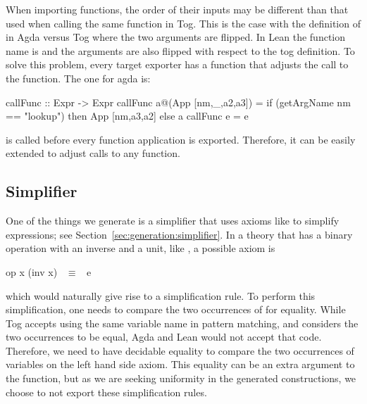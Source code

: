 \begin{comment}
In agda, \lstmath{Fin} is defined as 
\begin{agdacode}
data Fin : ~$\mathbb{N}$~ ~$\rightarrow$~ Set where
zero : {n : ~$\mathbb{N}$~} ~$\rightarrow$~ Fin (suc n)
suc  : {n : ~$\mathbb{N}$~} (i : Fin n) ~$\rightarrow$~ Fin (suc n)
\end{agdacode}
\end{comment} 
When importing functions, the order of their inputs may be different than that used when calling the same function in Tog. This is the case with the definition of  in Agda versus Tog where the two arguments are flipped. In Lean the function name is  and the arguments are also flipped with respect to the tog definition. To solve this problem, every target exporter has a function  that adjusts the call to the function. The one for agda is: 
\begin{hscode}
callFunc :: Expr -> Expr
callFunc a@(App [nm,_,a2,a3]) =
  if (getArgName nm == "lookup") then App [nm,a3,a2] else a
callFunc e = e
\end{hscode}
\noindent {} is called before every function application is exported. Therefore, it can be easily extended to adjust calls to any function. 

\subsection{Simplifier}
One of the things we generate is a simplifier that uses axioms like  to simplify expressions; see Section~\ref{sec:generation:simplifier}. 
In a theory that has a binary operation with an inverse and a unit, like , a possible axiom is  
\begin{agdacode}
op x (inv x) ~$\equiv$~ e 
\end{agdacode}
\noindent which would naturally give rise to a simplification rule. To perform this simplification, one needs to compare the two occurrences of  for equality. While Tog accepts using the same variable name in pattern matching, and considers the two occurrences to be equal, Agda and Lean would not accept that code. Therefore, we need to have decidable equality to compare the two occurrences of variables on the left hand side axiom. This equality can be an extra argument to the function, but as we are seeking uniformity in the generated constructions, we choose to not export these simplification rules. 

